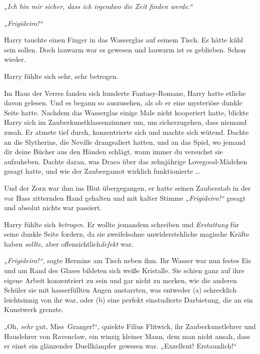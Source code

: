 

\hypertarget{gewissenhaftigkeit}{%

\later

\emph{„Ich bin mir sicher, dass ich irgendwo die Zeit finden werde.“}

\later

\emph{„Frigideiro!“}

Harry tauchte einen Finger in das Wasserglas auf seinem Tisch. Es hätte kühl sein sollen. Doch lauwarm war es gewesen und lauwarm ist es geblieben. Schon wieder.

Harry fühlte sich sehr, sehr betrogen.

Im Haus der Verres fanden sich hunderte Fantasy-Romane, Harry hatte etliche davon gelesen. Und es begann so auszusehen, als ob er eine mysteriöse dunkle Seite hatte. Nachdem das Wasserglas einige Male nicht kooperiert hatte, blickte Harry sich im Zauberkunstklassenzimmer um, um sicherzugehen, dass niemand zusah. Er atmete tief durch, konzentrierte sich und machte sich wütend. Dachte an die Slytherins, die Neville drangsaliert hatten, und an das Spiel, wo jemand dir deine Bücher aus den Händen schlägt, wann immer du versuchst sie aufzuheben. Dachte daran, was Draco über das zehnjährige Lovegood-Mädchen gesagt hatte, und wie der Zaubergamot wirklich funktionierte …

Und der Zorn war ihm ins Blut übergegangen, er hatte seinen Zauberstab in der vor Hass zitternden Hand gehalten und mit kalter Stimme \emph{„Frigideiro!“} gesagt und absolut nichts war passiert.

Harry fühlte sich \emph{betrogen.} Er wollte jemandem schreiben und \emph{Erstattung} für seine dunkle Seite fordern, da sie zweifelsohne unwiderstehliche magische Kräfte haben \emph{sollte,} aber offensichtlich\emph{defekt} war.

\emph{„Frigideiro!“,} sagte Hermine am Tisch neben ihm. Ihr Wasser war nun festes Eis und am Rand des Glases bildeten sich weiße Kristalle. Sie schien ganz auf ihre eigene Arbeit konzentriert zu sein und gar nicht zu merken, wie die anderen Schüler sie mit hasserfüllten Augen anstarrten, was entweder (a) schrecklich leichtsinnig von ihr war, oder (b) eine perfekt einstudierte Darbietung, die an ein Kunstwerk grenzte.

„Oh, \emph{sehr} gut, Miss~Granger!“, quiekte Filius Flitwick, ihr Zauberkunstlehrer und Hauslehrer von Ravenclaw, ein winzig kleiner Mann, dem man nicht ansah, dass er einst ein glänzender Duellkämpfer gewesen war. „Exzellent! Erstaunlich!“

}
